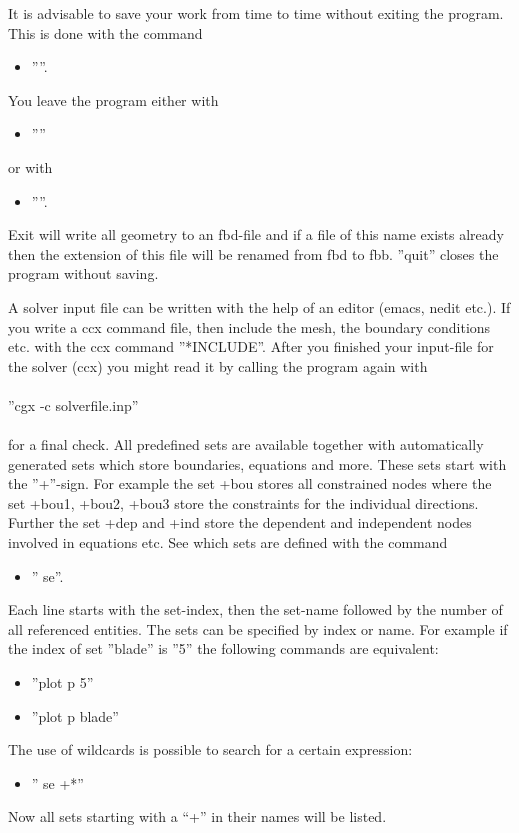 \documentclass{article}
\begin{document}
It is advisable to save your work from time to time without exiting the program. This is done with the command
\begin{itemize}
\item ''''.
\end{itemize}
You leave the program either with 
\begin{itemize}
\item ''''
\end{itemize}
or with
\begin{itemize}
\item ''''.
\end{itemize}
Exit will write all geometry to an fbd-file and if a file of this name exists already then the extension of this file will be renamed from fbd to fbb. ''quit''  closes the program without saving. 

A solver input file can be written with the help of an editor (emacs, nedit etc.). If you write a ccx command file, then include the mesh, the boundary conditions etc. with the ccx command ''*INCLUDE''. After you finished your input-file for the solver (ccx) you might read it by calling the program again with\\\\  ''cgx -c solverfile.inp''\\\\for a final check. All predefined sets are available together with automatically generated sets which store boundaries, equations and more. These sets start with the ''+''-sign. For example the set +bou stores all constrained nodes where the set +bou1, +bou2, +bou3 store the constraints for the individual directions. Further the set +dep and +ind store the dependent and independent nodes involved in equations etc. See which sets are defined with the command
\begin{itemize}
\item '' se''.
\end{itemize}
Each line starts with the set-index, then the set-name followed by the number of all referenced entities. The sets can be specified by index or name. For example if the index of set ''blade'' is ''5'' the following commands are equivalent:
\begin{itemize}
\item ''plot p 5''
\item ''plot p blade''
\end{itemize}
The use of wildcards is possible to search for a certain expression:
\begin{itemize}
\item '' se +*''
\end{itemize}
Now all sets starting with a ``+'' in their names will be listed.
\end{document}
